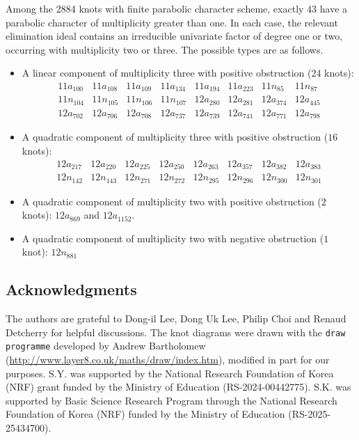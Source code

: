 \documentclass[12pt,reqno]{amsart}
\theoremstyle{definition}
\begin{document}
	Among the 2884 knots with finite parabolic character scheme, exactly $43$ have a parabolic character of multiplicity greater than one. In each case, the relevant elimination ideal contains an irreducible univariate factor of degree one or two, occurring with multiplicity two or three. The possible types are as follows.
    \begin{itemize}
        \item A linear component of multiplicity three with positive obstruction ($24$ knots):
	{\small
		\[
		\begin{array}{*{8}{l}}
			11a_{100} & 11a_{108} & 11a_{109} & 11a_{134} & 11a_{194} & 11a_{223} & 11n_{85} & 11n_{87} \\
			11n_{104} & 11n_{105} & 11n_{106} & 11n_{107} & 12a_{280} & 12a_{281} & 12a_{374} & 12a_{445} \\
			12a_{702} & 12a_{706} & 12a_{708} & 12a_{737} & 12a_{739} & 12a_{741} & 12a_{771} & 12a_{798}
		\end{array}
		\]
	}%
    \item A quadratic component of multiplicity three with positive obstruction ($16$ knots):
	{\small
		\[
		\begin{array}{*{8}{l}}
			12a_{217} & 12a_{220} & 12a_{225} & 12a_{250} & 12a_{263} & 12a_{357} & 12a_{382} & 12a_{383} \\
			12n_{142} & 12n_{143} & 12n_{271} & 12n_{272} & 12n_{295} & 12n_{296} & 12n_{300} & 12n_{301}
		\end{array}
		\]
	}%
    \item A quadratic component of multiplicity two with positive obstruction ($2$ knots): $12a_{869}$ and $12a_{1152}$.
    \item A quadratic component of multiplicity two with negative obstruction ($1$ knot): $12n_{881}$
    \end{itemize}

	
	\subsection*{Acknowledgments}
	The authors are grateful to Dong-il Lee, Dong Uk Lee, Philip Choi and Renaud Detcherry for helpful discussions. 
	The knot diagrams were drawn with the \texttt{draw programme} developed by Andrew Bartholomew (\url{http://www.layer8.co.uk/maths/draw/index.htm}), modified in part for our purposes.
	S.Y. was supported by the National Research Foundation of Korea (NRF) grant funded by the Ministry of Education (RS-2024-00442775).
	S.K. was supported by Basic Science Research Program through the National Research Foundation of Korea (NRF) funded by the Ministry of Education (RS-2025-25434700).

	
	
\end{document}

